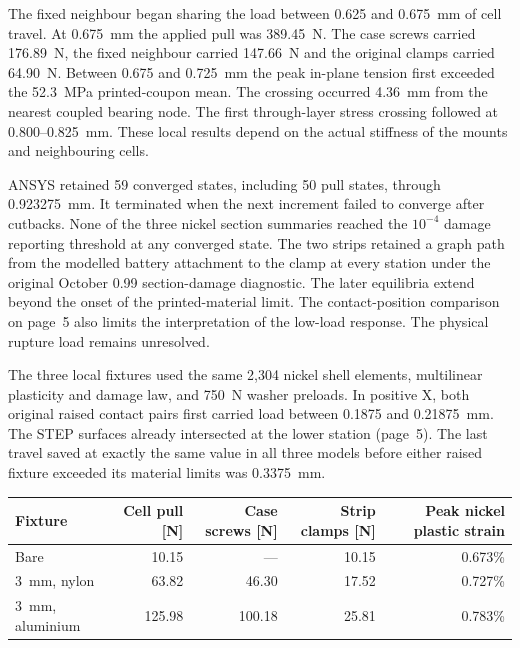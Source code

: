 The fixed neighbour began sharing the load between 0.625 and 0.675~mm of cell travel. At 0.675~mm the applied pull was 389.45~N. The case screws carried 176.89~N, the fixed neighbour carried 147.66~N and the original clamps carried 64.90~N. Between 0.675 and 0.725~mm the peak in-plane tension first exceeded the 52.3~MPa printed-coupon mean. The crossing occurred 4.36~mm from the nearest coupled bearing node. The first through-layer stress crossing followed at 0.800--0.825~mm. These local results depend on the actual stiffness of the mounts and neighbouring cells.

ANSYS retained 59 converged states, including 50 pull states, through 0.923275~mm. It terminated when the next increment failed to converge after cutbacks. None of the three nickel section summaries reached the $10^{-4}$ damage reporting threshold at any converged state. The two strips retained a graph path from the modelled battery attachment to the clamp at every station under the original October 0.99 section-damage diagnostic. The later equilibria extend beyond the onset of the printed-material limit. The contact-position comparison on page~5 also limits the interpretation of the low-load response. The physical rupture load remains unresolved.

\newpage
{}
The three local fixtures used the same 2,304 nickel shell elements, multilinear plasticity and damage law, and 750~N washer preloads. In positive X, both original raised contact pairs first carried load between 0.1875 and 0.21875~mm. The STEP surfaces already intersected at the lower station (page~5). The last travel saved at exactly the same value in all three models before either raised fixture exceeded its material limits was 0.3375~mm.

\begin{center}\small
\begin{tabular}{lrrrr}\toprule
Fixture & Cell pull [N] & Case screws [N] & Strip clamps [N] & Peak nickel plastic strain\\\midrule
Bare & 10.15 & --- & 10.15 & 0.673\%\\
3~mm, nylon & 63.82 & 46.30 & 17.52 & 0.727\%\\
3~mm, aluminium & 125.98 & 100.18 & 25.81 & 0.783\%\\\bottomrule
\end{tabular}
\end{center}

